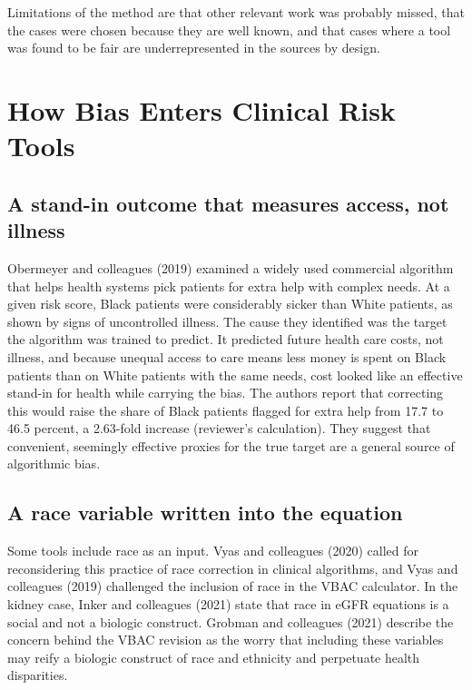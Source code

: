 \documentclass[12pt]{article}
\begin{document}
Limitations of the method are that other relevant work was probably missed, that the cases were chosen because they are well known, and that cases where a tool was found to be fair are underrepresented in the sources by design.

\section*{How Bias Enters Clinical Risk Tools}
\subsection*{A stand-in outcome that measures access, not illness}
Obermeyer and colleagues (2019) examined a widely used commercial algorithm that helps health systems pick patients for extra help with complex needs. At a given risk score, Black patients were considerably sicker than White patients, as shown by signs of uncontrolled illness. The cause they identified was the target the algorithm was trained to predict. It predicted future health care costs, not illness, and because unequal access to care means less money is spent on Black patients than on White patients with the same needs, cost looked like an effective stand-in for health while carrying the bias. The authors report that correcting this would raise the share of Black patients flagged for extra help from 17.7 to 46.5 percent, a 2.63-fold increase (reviewer's calculation). They suggest that convenient, seemingly effective proxies for the true target are a general source of algorithmic bias.

\subsection*{A race variable written into the equation}
Some tools include race as an input. Vyas and colleagues (2020) called for reconsidering this practice of race correction in clinical algorithms, and Vyas and colleagues (2019) challenged the inclusion of race in the VBAC calculator. In the kidney case, Inker and colleagues (2021) state that race in eGFR equations is a social and not a biologic construct. Grobman and colleagues (2021) describe the concern behind the VBAC revision as the worry that including these variables may reify a biologic construct of race and ethnicity and perpetuate health disparities.
\end{document}
